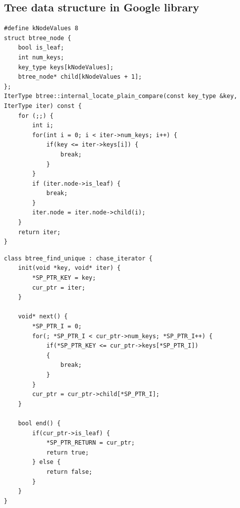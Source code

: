 \begin{minipage}{0.47\textwidth}
\subsection{Tree data structure in Google library}
\centering
\begin{lstlisting}[caption={Google realization for\\\code{btree::internal\_locate\_plain\_compare()}},label={lst:btree}, captionpos=t]
#define kNodeValues 8
struct btree_node {
    bool is_leaf;    
    int num_keys;
    key_type keys[kNodeValues];
    btree_node* child[kNodeValues + 1];
};
IterType btree::internal_locate_plain_compare(const key_type &key, IterType iter) const {
    for (;;) { 
        int i;
        for(int i = 0; i < iter->num_keys; i++) {
            if(key <= iter->keys[i]) {
                break;
            }
        }
        if (iter.node->is_leaf) {
            break;
        }
        iter.node = iter.node->child(i);
    }
    return iter;
}
\end{lstlisting}

\begin{lstlisting}[caption={\name realization for\\\code{btree::internal\_locate\_plain\_compare()}},label={lst:btree_mod}, captionpos=t]
class btree_find_unique : chase_iterator {
    init(void *key, void* iter) {
        *SP_PTR_KEY = key;
        cur_ptr = iter;
    }
  
    void* next() {
        *SP_PTR_I = 0;
        for(; *SP_PTR_I < cur_ptr->num_keys; *SP_PTR_I++) {
            if(*SP_PTR_KEY <= cur_ptr->keys[*SP_PTR_I]) 
            {
                break;
            }
        }
        cur_ptr = cur_ptr->child[*SP_PTR_I];
    }
  
    bool end() {
        if(cur_ptr->is_leaf) {
            *SP_PTR_RETURN = cur_ptr;
            return true;
        } else {
            return false;
        }
    }
}
\end{lstlisting}
\end{minipage}







